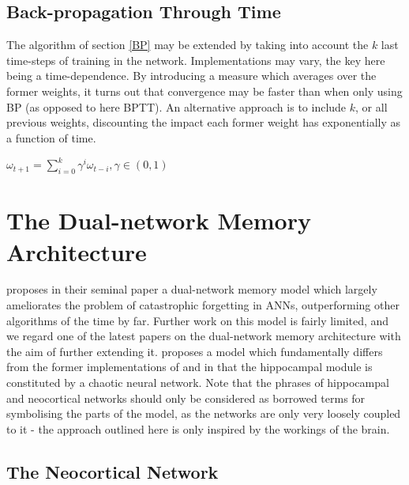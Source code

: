 \subsection{Back-propagation Through Time}

The algorithm of section \ref{BP} may be extended by taking into account the $k$ last time-steps of training in the network. Implementations may vary, the key here being a time-dependence. By introducing a measure which averages over the former weights, it turns out that convergence may be faster than when only using BP (as opposed to here BPTT). An alternative approach is to include $k$, or all previous weights, discounting the impact each former weight has exponentially as a function of time.

\begin{center}
\begin{math}
    \omega_{t+1} = \sum_{i=0}^{k}\gamma^i \omega_{t-i},
    \gamma \in (0, 1)
\end{math}
\end{center}

\section{The Dual-network Memory Architecture}

\cite{McClelland1995} proposes in their seminal paper a dual-network memory model which largely ameliorates the problem of catastrophic forgetting in ANNs, outperforming other algorithms of the time by far. Further work on this model is fairly limited, and we regard one of the latest papers on the dual-network memory architecture with the aim of further extending it. \cite{Hattori2010} proposes a model which fundamentally differs from the former implementations of \cite{French1997} and \cite{Ans1997} in that the hippocampal module is constituted by a chaotic neural network. Note that the phrases of hippocampal and neocortical networks should only be considered as borrowed terms for symbolising the parts of the model, as the networks are only very loosely coupled to it - the approach outlined here is only inspired by the workings of the brain.

\subsection{The Neocortical Network}

